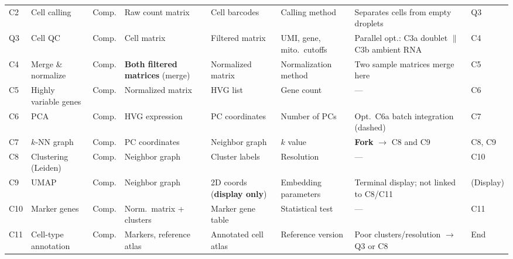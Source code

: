 \begin{table}[htbp]
\begin{tabularx}{\linewidth}{@{}l>{\raggedright\arraybackslash}p{15mm}l>{\raggedright\arraybackslash}p{16mm}>{\raggedright\arraybackslash}p{16mm}YYl@{}}
C2 & Cell calling & Comp. & Raw count matrix & Cell barcodes & Calling method & Separates cells from empty droplets & Q3 \\
Q3 & Cell QC & Comp. & Cell matrix & Filtered matrix & UMI, gene, mito.\ cutoffs & Parallel opt.: C3a doublet $\parallel$ C3b ambient RNA & C4 \\
C4 & Merge \& normalize & Comp. & \textbf{Both filtered matrices} (merge) & Normalized matrix & Normalization method & Two sample matrices merge here & C5 \\
C5 & Highly variable genes & Comp. & Normalized matrix & HVG list & Gene count & — & C6 \\
C6 & PCA & Comp. & HVG expression & PC coordinates & Number of PCs & Opt.\ C6a batch integration (dashed) & C7 \\
C7 & $k$-NN graph & Comp. & PC coordinates & Neighbor graph & $k$ value & \textbf{Fork} $\rightarrow$ C8 and C9 & C8, C9 \\
C8 & Clustering (Leiden) & Comp. & Neighbor graph & Cluster labels & Resolution & — & C10 \\
C9 & UMAP & Comp. & Neighbor graph & 2D coords (\textbf{display only}) & Embedding parameters & Terminal display; not linked to C8/C11 & (Display) \\
C10 & Marker genes & Comp. & Norm.\ matrix + clusters & Marker gene table & Statistical test & — & C11 \\
C11 & Cell-type annotation & Comp. & Markers, reference atlas & Annotated cell atlas & Reference version & Poor clusters/resolution $\rightarrow$ Q3 or C8 & End \\
\bottomrule
\end{tabularx}
\end{table}

